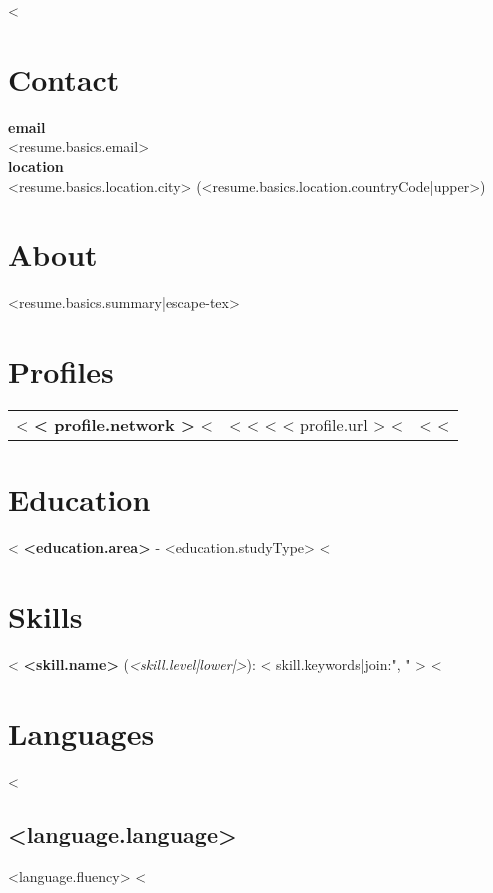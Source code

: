 \documentclass{resume}
\begin{document}
<%
\section{Contact}
\begin{multicols}{2}
\noindent\textbf{email}\\
<{resume.basics.email}>\\
\textbf{location}\\
<{resume.basics.location.city}> (<{resume.basics.location.countryCode|upper}>)
\end{multicols}
\section{About}
<{resume.basics.summary|escape-tex}>
\section{Profiles}
\begin{center}
  \begin{tabular}{ c c }
    <%
    \textbf{<{ profile.network }>}
    <%
    &
    <%
    <%
    <%
    <{ profile.url }>
    <%
    &
    <%
    <%
  \end{tabular}
\end{center}
\section{Education}
<%
\noindent\textbf{<{education.area}>} - <{education.studyType}>
<%
\section{Skills}
<%
\noindent\textbf{<{skill.name}>} (\textit{<{skill.level|lower|}>}): <{ skill.keywords|join:", " }>
<%
\section{Languages}
\begin{multicols}{2}
  <%
  \subsection{<{language.language}>}
  <{language.fluency}>
  <%
\end{multicols}
\end{document}
